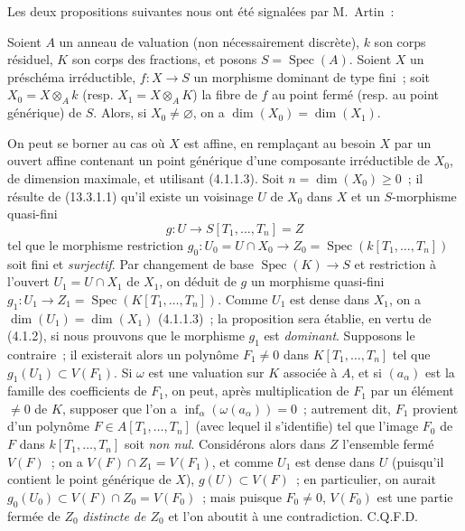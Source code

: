 Les deux propositions suivantes nous ont été signalées par M.~Artin~:

\begin{lemma}[14.3.10]
\label{IV.14.3.10-fr}
Soient $A$ un anneau de valuation (non nécessairement discrète), $k$ son corps
résiduel, $K$ son corps des fractions, et posons $S=\operatorname{Spec}(A)$. Soient
$X$ un préschéma irréductible, $f:X\to S$ un morphisme dominant de type fini~; soit
$X_0=X\otimes_A k$ (resp. $X_1=X\otimes_A K$) la fibre de $f$ au point fermé
(resp. au point générique) de $S$. Alors, si $X_0\ne\varnothing$, on a
$\dim(X_0)=\dim(X_1)$.
\end{lemma}

On peut se borner au cas où $X$ est affine, en remplaçant au besoin $X$ par un
ouvert affine contenant un point générique d'une composante irréductible de $X_0$,
de dimension maximale, et utilisant (4.1.1.3). Soit $n=\dim(X_0)\geq 0$~; il résulte
de (13.3.1.1) qu'il existe un voisinage $U$ de $X_0$ dans $X$ et un $S$-morphisme
quasi-fini
\[
  g:U\to S[T_1,\ldots,T_n]=Z
\]
tel que le morphisme restriction
$g_0:U_0=U\cap X_0\to Z_0=\operatorname{Spec}(k[T_1,\ldots,T_n])$ soit fini et
\emph{surjectif}. Par changement de base $\operatorname{Spec}(K)\to S$ et restriction
à l'ouvert $U_1=U\cap X_1$ de $X_1$, on déduit de $g$ un morphisme quasi-fini
$g_1:U_1\to Z_1=\operatorname{Spec}(K[T_1,\ldots,T_n])$. Comme $U_1$ est dense dans
$X_1$, on a $\dim(U_1)=\dim(X_1)$ (4.1.1.3)~; la proposition sera établie, en vertu
de (4.1.2), si nous prouvons que le morphisme $g_1$ est \emph{dominant}. Supposons
le contraire~; il existerait alors un polynôme $F_1\ne 0$ dans
$K[T_1,\ldots,T_n]$ tel que $g_1(U_1)\subset V(F_1)$. Si $\omega$ est une valuation
sur $K$ associée à $A$, et si $(a_\alpha)$ est la famille des coefficients de $F_1$,
on peut, après multiplication de $F_1$ par un élément $\ne 0$ de $K$, supposer que
l'on a $\inf_\alpha(\omega(a_\alpha))=0$~; autrement dit, $F_1$ provient d'un
polynôme $F\in A[T_1,\ldots,T_n]$ (avec lequel il s'identifie) tel que l'image $F_0$
de $F$ dans $k[T_1,\ldots,T_n]$ soit \emph{non nul}. Considérons alors dans $Z$
l'ensemble fermé $V(F)$~; on a $V(F)\cap Z_1=V(F_1)$, et comme $U_1$ est dense
dans $U$ (puisqu'il contient le point générique de $X$), $g(U)\subset V(F)$~; en
particulier, on aurait $g_0(U_0)\subset V(F)\cap Z_0=V(F_0)$~; mais puisque
$F_0\ne 0$, $V(F_0)$ est une partie fermée de $Z_0$ \emph{distincte de $Z_0$} et
l'on aboutit à une contradiction. C.Q.F.D.

